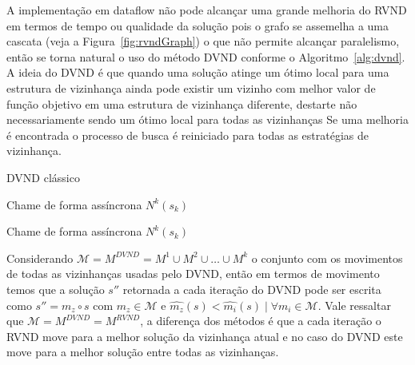 A implementação em dataflow não pode alcançar uma grande melhoria do RVND em termos de tempo ou qualidade da solução pois o grafo se assemelha a uma cascata (veja a Figura~\ref{fig:rvndGraph}) o que não permite alcançar paralelismo, então se torna natural o uso do método DVND conforme o Algoritmo~\ref{alg:dvnd}. 
A ideia do DVND é que quando uma solução atinge um ótimo local para uma estrutura de vizinhança ainda pode existir um vizinho com melhor valor de função objetivo em uma estrutura de vizinhança diferente, destarte não necessariamente sendo um ótimo local para todas as vizinhanças
Se uma melhoria é encontrada o processo de busca é reiniciado para todas as estratégias de vizinhança.

\begin{algorithm}[htpb]
\caption{DVND clássico}\label{alg:dvnd}
\begin{algorithmic}[1]
             
             
             
            \State Chame de forma assíncrona $N^k(s_k)$
        \EndFor
        
             
            \EndIf
            
                    
                    \State Chame de forma assíncrona $N^k(s_k)$
                \EndIf
            \EndFor
        \EndWhile
    \EndFunction
\end{algorithmic}
\end{algorithm}

Considerando $ \mathcal{M} = M^{DVND} = M^1 \cup M^2 \cup \dots \cup M^k $ o conjunto com os movimentos de todas as vizinhanças usadas pelo DVND, então em termos de movimento temos que a solução $s''$ retornada a cada iteração do DVND pode ser escrita como $s'' = m_z \circ s$ com $m_z \in \mathcal{M}$ e $\widehat{m_z}(s) < \widehat{m_i}(s) \mid \forall m_i \in \mathcal{M}$.
Vale ressaltar que $\mathcal{M} = M^{DVND} = M^{RVND}$, a diferença dos métodos é que a cada iteração o RVND move para a melhor solução da vizinhança atual e no caso do DVND este move para a melhor solução entre todas as vizinhanças.

